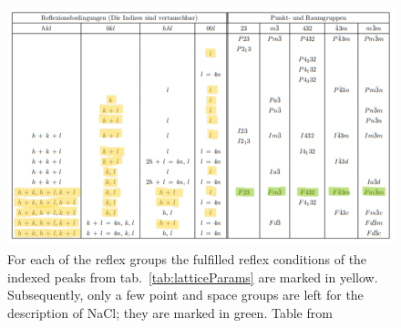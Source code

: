 \begin{figure}[ht]
    \centering
    \includegraphics[angle = 90, width = 0.8 \linewidth]{Bilder/Auswertung/NaCl/table extinktion marked.png}
    \caption{For each of the reflex groups the fulfilled reflex conditions of the indexed peaks from tab.~\ref{tab:latticeParams} are marked in yellow. Subsequently, only a few point and space groups are left for the description of NaCl; they are marked in green. Table from~\cite{Aroyo2016}}
    \label{fig:reflexCond}
\end{figure}


